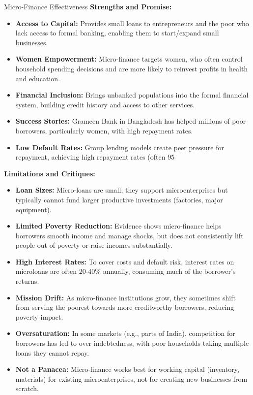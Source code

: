 \documentclass[11pt, a4paper, twoside]{book}
\begin{document}
\begin{evaluation}{Micro-Finance Effectiveness}
\textbf{Strengths and Promise:}
\begin{itemize}
  \item \textbf{Access to Capital:} Provides small loans to entrepreneurs and the poor who lack access to formal banking, enabling them to start/expand small businesses.
  \item \textbf{Women Empowerment:} Micro-finance targets women, who often control household spending decisions and are more likely to reinvest profits in health and education.
  \item \textbf{Financial Inclusion:} Brings unbanked populations into the formal financial system, building credit history and access to other services.
  \item \textbf{Success Stories:} Grameen Bank in Bangladesh has helped millions of poor borrowers, particularly women, with high repayment rates.
  \item \textbf{Low Default Rates:} Group lending models create peer pressure for repayment, achieving high repayment rates (often 95%
\end{itemize}

\textbf{Limitations and Critiques:}
\begin{itemize}
  \item \textbf{Loan Sizes:} Micro-loans are small; they support microenterprises but typically cannot fund larger productive investments (factories, major equipment).
  \item \textbf{Limited Poverty Reduction:} Evidence shows micro-finance helps borrowers smooth income and manage shocks, but does not consistently lift people out of poverty or raise incomes substantially.
  \item \textbf{High Interest Rates:} To cover costs and default risk, interest rates on microloans are often 20-40\% annually, consuming much of the borrower's returns.
  \item \textbf{Mission Drift:} As micro-finance institutions grow, they sometimes shift from serving the poorest towards more creditworthy borrowers, reducing poverty impact.
  \item \textbf{Oversaturation:} In some markets (e.g., parts of India), competition for borrowers has led to over-indebtedness, with poor households taking multiple loans they cannot repay.
  \item \textbf{Not a Panacea:} Micro-finance works best for working capital (inventory, materials) for existing microenterprises, not for creating new businesses from scratch.
\end{itemize}


\end{evaluation}
\end{document}
